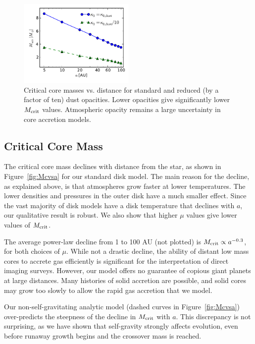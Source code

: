 \documentclass[apj, numberedappendix]{emulateapj}
\newcommand{\Fig}[1]{Figure~\ref{#1}}
\newcommand{\MC}{M_{\rm crit}}
\begin{document}
\begin{figure}[htb]
\centering
\includegraphics[width=0.5\textwidth]{Mcrit_vs_a_3Myrs_opacity.pdf}
\caption{Critical core masses vs. distance for standard and reduced (by a factor of ten) dust opacities.  Lower opacities give significantly lower $\MC$ values.  Atmospheric opacity remains a large uncertainty in core accretion models.}
\label{fig:Mcritopacity}
\end{figure}

\subsection{Critical Core Mass}
\label{sec:critcore}

The critical core mass declines with distance from the star, as shown in \Fig{fig:Mcvsa} for our standard disk model.   The main reason for the decline, as explained above, is that atmospheres grow faster at lower temperatures.  The lower densities and pressures in the outer disk have a much smaller effect.  Since the vast majority of disk models have a disk temperature that declines with $a$, our qualitative result is robust.   We also show that higher $\mu$ values give lower values of $\MC$.

The average power-law decline from 1 to 100 AU (not plotted) is $\MC \propto a^{-0.3}$, for both choices of $\mu$.   While not a drastic decline, the ability of distant low mass cores to accrete gas efficiently is significant for the interpretation of direct imaging surveys.  However, our model offers no guarantee of copious giant planets at large distances.  Many histories of solid accretion are possible, and solid cores may grow too slowly to allow the rapid gas accretion that we model.  

Our non-self-gravitating analytic model (dashed curves in \Fig{fig:Mcvsa}) over-predicts the steepness of the decline in $\MC$ with $a$.  This discrepancy is not surprising, as we have shown that self-gravity strongly affects evolution, even before runaway growth begins and the crossover mass is reached.
\end{document}
